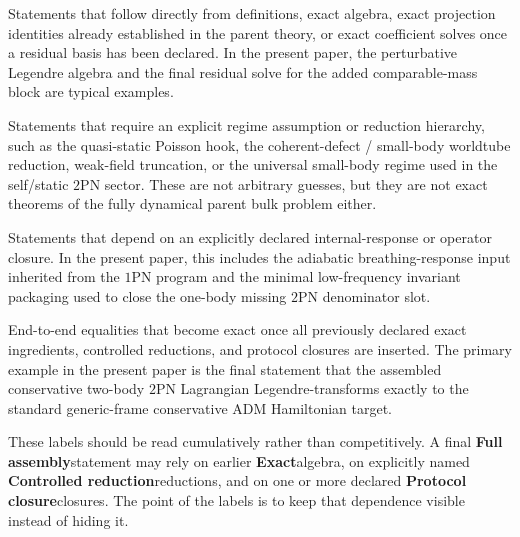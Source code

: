 \documentclass[11pt]{article}
\newcommand{\OnePN}{\mathrm{1PN}}
\newcommand{\TwoPN}{\mathrm{2PN}}
\newcommand{\ADM}{\mathrm{ADM}}
\newcommand{\Exact}{\textbf{Exact}}
\newcommand{\Controlled}{\textbf{Controlled reduction}}
\newcommand{\Protocol}{\textbf{Protocol closure}}
\newcommand{\FullMatch}{\textbf{Full assembly}}
\begin{document}
\begin{description}[leftmargin=1.8em,style=nextline]
  \item[\Exact]
  Statements that follow directly from definitions, exact algebra, exact projection
  identities already established in the parent theory, or exact coefficient solves once a
  residual basis has been declared.  In the present paper, the perturbative Legendre
  algebra and the final residual solve for the added comparable-mass block are typical
  examples.

  \item[\Controlled reduction]
  Statements that require an explicit regime assumption or reduction hierarchy, such as the
  quasi-static Poisson hook, the coherent-defect / small-body worldtube reduction, weak-field
  truncation, or the universal small-body regime used in the self/static \(\TwoPN\)
  sector.  These are not arbitrary guesses, but they are not exact theorems of the fully
  dynamical parent bulk problem either.

  \item[\Protocol closure]
  Statements that depend on an explicitly declared internal-response or operator closure.
  In the present paper, this includes the adiabatic breathing-response input inherited from
  the \(\OnePN\) program and the minimal low-frequency invariant packaging used to close
  the one-body missing \(\TwoPN\) denominator slot.

  \item[\textbf{Full assembly}]
  End-to-end equalities that become exact once all previously declared exact ingredients,
  controlled reductions, and protocol closures are inserted.  The primary example in the
  present paper is the final statement that the assembled conservative two-body
  \(\TwoPN\) Lagrangian Legendre-transforms exactly to the standard generic-frame
  conservative \(\ADM\) Hamiltonian target.
\end{description}

These labels should be read cumulatively rather than competitively.
A final \FullMatch statement may rely on earlier \Exact algebra, on explicitly named
\Controlled reductions, and on one or more declared \Protocol closures.
The point of the labels is to keep that dependence visible instead of hiding it.
\end{document}
